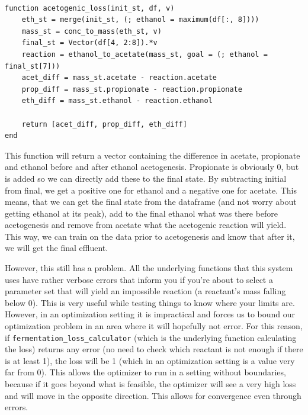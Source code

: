 \documentclass[11pt]{article}
\begin{document}
\begin{verbatim}

function acetogenic_loss(init_st, df, v)
    eth_st = merge(init_st, (; ethanol = maximum(df[:, 8])))
    mass_st = conc_to_mass(eth_st, v)
    final_st = Vector(df[4, 2:8]).*v
    reaction = ethanol_to_acetate(mass_st, goal = (; ethanol = final_st[7]))
    acet_diff = mass_st.acetate - reaction.acetate
    prop_diff = mass_st.propionate - reaction.propionate
    eth_diff = mass_st.ethanol - reaction.ethanol

    return [acet_diff, prop_diff, eth_diff]
end
\end{verbatim}

This function will return a vector containing the difference in acetate, propionate and ethanol before and after ethanol acetogenesis. Propionate is obviously 0, but is added so we can directly add these to the final state. By subtracting initial from final, we get a positive one for ethanol and a negative one for acetate. This means, that we can get the final state from the dataframe (and not worry about getting ethanol at its peak), add to the final ethanol what was there before acetogenesis and remove from acetate what the acetogenic reaction will yield. This way, we can train on the data prior to acetogenesis and know that after it, we will get the final effluent.

However, this still has a problem. All the underlying functions that this system uses have rather verbose errors that inform you if you're about to select a parameter set that will yield an impossible reaction (a reactant's mass falling below 0). This is very useful while testing things to know where your limits are. However, in an optimization setting it is impractical and forces us to bound our optimization problem in an area where it will hopefully not error. For this reason, if \texttt{fermentation\_loss\_calculator} (which is the underlying function calculating the loss) returns any error (no need to check which reactant is not enough if there is at least 1), the loss will be 1 (which in an optimization setting is a value very far from 0). This allows the optimizer to run in a setting without boundaries, because if it goes beyond what is feasible, the optimizer will see a very high loss and will move in the opposite direction. This allows for convergence even through errors.
\end{document}
